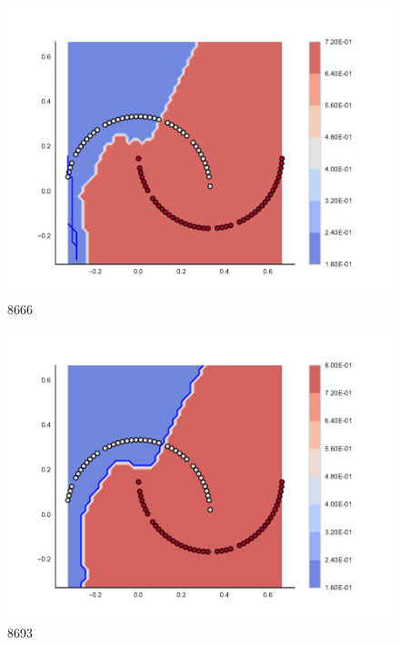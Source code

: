 \begin{subfigure}[b]{0.09\textwidth}
    \includegraphics[clip, trim=2.35cm 1.75cm 4.5cm 0cm,width=\textwidth]{img/convergence/8666.pdf}
    \caption{8666}
    \label{fig:convergence_8666}
\end{subfigure}
%
\begin{subfigure}[b]{0.09\textwidth}
    \includegraphics[clip, trim=2.35cm 1.75cm 4.5cm 0cm,width=\textwidth]{img/convergence/8693.pdf}
    \caption{8693}
    \label{fig:convergence_8693}
\end{subfigure}
%
